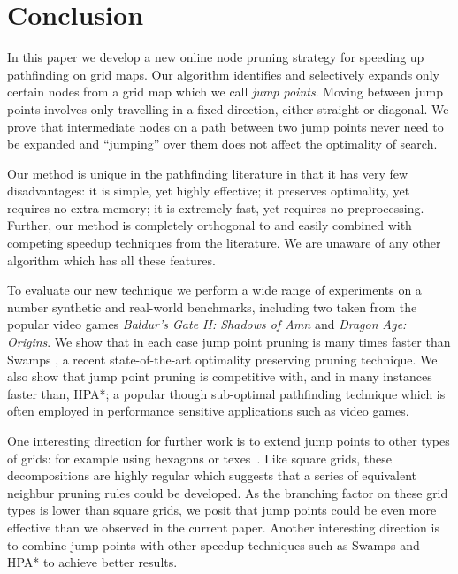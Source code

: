 \section{Conclusion}
In this paper we develop a new online node pruning strategy for speeding up
pathfinding on grid maps.  Our algorithm identifies and selectively expands only
certain nodes from a grid map which we call \emph{jump points}.  Moving between
jump points involves only travelling in a fixed direction, either straight or
diagonal.  We prove that intermediate nodes on a path between two jump points
never need to be expanded and ``jumping'' over them does not affect the
optimality of search.
\par
Our method is unique in the pathfinding literature in that it has very few
disadvantages: it is simple, yet highly effective; it preserves optimality, yet
requires no extra memory;  it is extremely fast, yet requires no preprocessing.
Further, our method is completely orthogonal to and easily combined with 
competing speedup techniques from the literature.
We are unaware of any other algorithm which has all these features.
\par
To evaluate our new technique we perform a wide range of experiments on a number
synthetic and real-world benchmarks, including two taken from the popular video
games \emph{Baldur's Gate II: Shadows of Amn} and \emph{Dragon Age: Origins}.
We show that in each case jump point pruning is many times faster than Swamps
\cite{pochter10}, a recent state-of-the-art optimality preserving pruning
technique.  We also show that jump point pruning is competitive with, and in
many instances faster than, HPA*; a popular though sub-optimal pathfinding
technique which is often employed in performance sensitive applications such as
video games.
\par
One interesting direction for further work is to extend jump points to other
types of grids: for example using hexagons or texes~\cite{yap02}.
Like square grids, these decompositions are highly regular which suggests that
a series of equivalent neighbur pruning rules could be developed.
As the branching factor on these grid types is lower than square grids, we posit
that jump points could be even more effective than we observed in the current paper.
Another interesting direction is to combine jump points with other
speedup techniques such as Swamps and HPA* to achieve better results.
